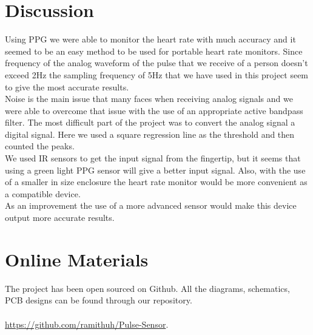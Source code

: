\documentclass[12pt]{article}
\begin{document}
\section{Discussion}
Using PPG we were able to monitor the heart rate with much accuracy and it seemed to be an easy method to be used for portable heart rate monitors. Since frequency of the analog waveform of the pulse that we receive of a person doesn’t exceed 2Hz the sampling frequency of 5Hz that we have used in this project seem to give the most accurate results. 
\\
Noise is the main issue that many faces when receiving analog signals and we were able to overcome that issue with the use of an appropriate active bandpass filter. The most difficult part of the project was to convert the analog signal a digital signal. Here we used a square regression line as the threshold and then counted the peaks.
\\
We used IR sensors to get the input signal from the fingertip, but it seems that using a green light PPG sensor will give a better input signal. Also, with the use of a smaller in size enclosure the heart rate monitor would be more convenient as a compatible device.
\\
As an improvement the use of a more advanced sensor would make this device output more accurate results.


\newpage
\section{Online Materials}
The project has been open sourced on Github. All the diagrams, schematics, PCB designs can be found through our repository.\\\\
\faGithub\href{https://github.com/ramithuh/Pulse-Sensor}{ https://github.com/ramithuh/Pulse-Sensor}.

 
\newpage


{}

\end{document}
